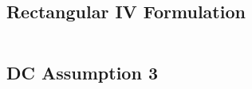 \subsection{Rectangular IV Formulation} 
% 
\begin{subequations}
    
    \label{app:foundations:sec:power-flow-analyses:eq:rectangular-iv}
\end{subequations}
% 
\clearpage
% 
\subsection{DC Assumption 3}
% 
\begin{subequations}
    
    \label{app:foundations:sec:power-flow-analyses:eq:how-to-neglect-reactance-in-a-DC-network}
\end{subequations}
% 
\clearpage
% 